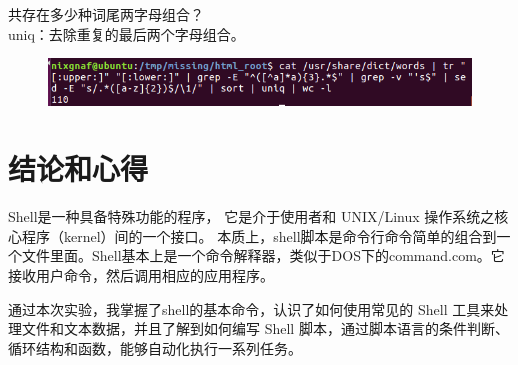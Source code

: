 \documentclass{article}
\begin{document}
共存在多少种词尾两字母组合？\\
uniq：去除重复的最后两个字母组合。
\begin{figure}[h]
    \centering
    \includegraphics[width=0.5\linewidth]{image27.png}
\end{figure}

\section{结论和心得}

Shell是一种具备特殊功能的程序， 它是介于使用者和 UNIX/Linux 操作系统之核心程序（kernel）间的一个接口。
本质上，shell脚本是命令行命令简单的组合到一个文件里面。Shell基本上是一个命令解释器，类似于DOS下的command.com。它接收用户命令，然后调用相应的应用程序。

通过本次实验，我掌握了shell的基本命令，认识了如何使用常见的 Shell 工具来处理文件和文本数据，并且了解到如何编写 Shell 脚本，通过脚本语言的条件判断、循环结构和函数，能够自动化执行一系列任务。
\end{document}
